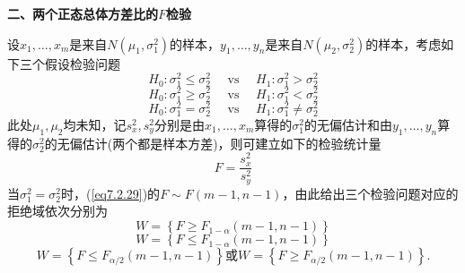 \textbf{二、两个正态总体方差比的$F$检验}

设$x_{1},\dotsc,x_{m}$是来自$N(\mu_{ 1 },\sigma_{1}^{2})$的样本，$y_{1},\dotsc,y_{n}$是来自$N(\mu_{ 2 },\sigma_{2}^{2})$的样本，考虑如下三个假设检验问题
\begin{equation}\label{eq7.2.26}
H _ { 0 } : \sigma _ { 1 } ^ { 2 } \leq \sigma _ { 2 } ^ { 2 } \quad \text { vs } \quad H _ { 1 } : \sigma _ { 1 } ^ { 2 } > \sigma _ { 2 } ^ { 2 }
\end{equation}
\begin{equation}\label{eq7.2.27}
H _ { 0 } : \sigma _ { 1 } ^ { 2 } \geq \sigma _ { 2 } ^ { 2 } \quad \text { vs } \quad H _ { 1 } : \sigma _ { 1 } ^ { 2 } < \sigma _ { 2 } ^ { 2 }
\end{equation}
\begin{equation}\label{eq7.2.28}
H _ { 0 } : \sigma _ { 1 } ^ { 2 } = \sigma _ { 2 } ^ { 2 } \quad \text { vs } \quad H _ { 1 } : \sigma _ { 1 } ^ { 2 }\ne  \sigma _ { 2 } ^ { 2 }
\end{equation}
此处$\mu_{ 1 },\mu_{ 2 }$均未知，记$s_{x}^{2},s_{y}^{2}$分别是由$x_{1},\dotsc,x_{m}$算得的$\sigma_{ 1 }^{2}$的无偏估计和由$y_{1},\dotsc,y_{n}$算得的$\sigma_{ 2 }^{2}$的无偏估计(两个都是样本方差)，则可建立如下的检验统计量
\begin{equation}\label{eq7.2.29}
F = \frac { s _ { x } ^ { 2 } } { s _ { y } ^ { 2 } }
\end{equation}
当$\sigma_{ 1 }^{2}=\sigma_{ 2 }^{2}$时，(\ref{eq7.2.29})的$F\sim F(m-1,n-1)$，由此给出三个检验问题对应的拒绝域依次分别为
\[W = \left\{ F \geq F _ { 1 - \alpha} ( m - 1 , n - 1 ) \right\}\]
\[W = \left\{ F \leq F _ { 1 - \alpha } ( m - 1 , n - 1 ) \right\}\]
\[W = \left\{ F \leq F _ { \alpha / 2 } ( m - 1 , n - 1 )\right\}\text{或}W = \left\{ F \geq F _ { \alpha / 2 } ( m - 1 , n - 1 )\right\}.\]
